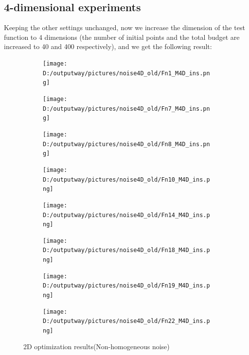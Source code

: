 \documentclass{article}
\begin{document}
\subsection{4-dimensional experiments}
Keeping the other settings unchanged, now we increase the dimension of the test function to 4 dimensions (the number of initial points and the total budget are increased to 40 and 400 respectively), and we get the following result:

 \begin{figure}[H]
    \centering
    \begin{subfigure}[t]{.32\linewidth}
        \centering
        \texttt{[image: D:/outputway/pictures/noise4D\_old/Fn1\_M4D\_ins.png]}
    \end{subfigure}
    \begin{subfigure}[t]{.32\linewidth}
        \centering
        \texttt{[image: D:/outputway/pictures/noise4D\_old/Fn7\_M4D\_ins.png]}
    \end{subfigure}
    \begin{subfigure}[t]{.32\linewidth}
        \centering
        \texttt{[image: D:/outputway/pictures/noise4D\_old/Fn8\_M4D\_ins.png]}
    \end{subfigure}
    \begin{subfigure}[t]{.32\linewidth}
        \centering
        \texttt{[image: D:/outputway/pictures/noise4D\_old/Fn10\_M4D\_ins.png]}
    \end{subfigure}
    \begin{subfigure}[t]{.32\linewidth}
        \centering
        \texttt{[image: D:/outputway/pictures/noise4D\_old/Fn14\_M4D\_ins.png]}
    \end{subfigure}
    \begin{subfigure}[t]{.32\linewidth}
        \centering
        \texttt{[image: D:/outputway/pictures/noise4D\_old/Fn18\_M4D\_ins.png]}
    \end{subfigure}
    \begin{subfigure}[t]{.32\linewidth}
        \centering
        \texttt{[image: D:/outputway/pictures/noise4D\_old/Fn19\_M4D\_ins.png]}
    \end{subfigure}
    \begin{subfigure}[t]{.32\linewidth}
        \centering
        \texttt{[image: D:/outputway/pictures/noise4D\_old/Fn22\_M4D\_ins.png]}
    \end{subfigure}
    \caption{2D optimization results(Non-homogeneous noise)}
    \label{Fig5}
\end{figure}
\end{document}
